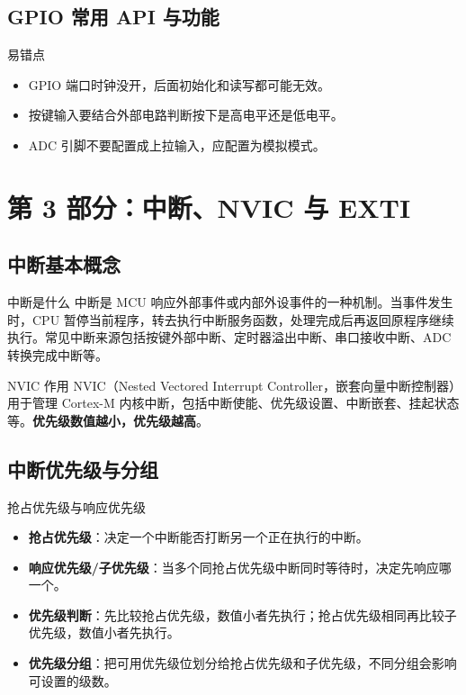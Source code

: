 \documentclass[UTF8,fontset=none,12pt]{ctexart}
\begin{document}
\subsection{GPIO 常用 API 与功能}

\begin{warnbox}{易错点}
\begin{itemize}
  \item GPIO 端口时钟没开，后面初始化和读写都可能无效。
  \item 按键输入要结合外部电路判断按下是高电平还是低电平。
  \item ADC 引脚不要配置成上拉输入，应配置为模拟模式。
\end{itemize}
\end{warnbox}

\section{第 3 部分：中断、NVIC 与 EXTI}

\subsection{中断基本概念}
\begin{pointbox}{中断是什么}
中断是 MCU 响应外部事件或内部外设事件的一种机制。当事件发生时，CPU 暂停当前程序，转去执行中断服务函数，处理完成后再返回原程序继续执行。常见中断来源包括按键外部中断、定时器溢出中断、串口接收中断、ADC 转换完成中断等。
\end{pointbox}

\begin{pointbox}{NVIC 作用}
NVIC（Nested Vectored Interrupt Controller，嵌套向量中断控制器）用于管理 Cortex-M 内核中断，包括中断使能、优先级设置、中断嵌套、挂起状态等。\textbf{优先级数值越小，优先级越高}。
\end{pointbox}

\subsection{中断优先级与分组}
\begin{pointbox}{抢占优先级与响应优先级}
\begin{itemize}
  \item \textbf{抢占优先级}：决定一个中断能否打断另一个正在执行的中断。
  \item \textbf{响应优先级/子优先级}：当多个同抢占优先级中断同时等待时，决定先响应哪一个。
  \item \textbf{优先级判断}：先比较抢占优先级，数值小者先执行；抢占优先级相同再比较子优先级，数值小者先执行。
  \item \textbf{优先级分组}：把可用优先级位划分给抢占优先级和子优先级，不同分组会影响可设置的级数。
\end{itemize}
\end{pointbox}
\end{document}
